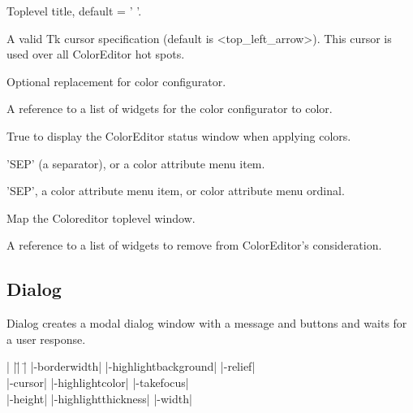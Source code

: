 \vskip5pt

\begin{enum}{1cm}

Toplevel title, default = ' '.

A valid Tk cursor specification (default is <top\_left\_arrow>).  This cursor is used over all ColorEditor
hot spots.

Optional replacement for  color configurator.

A reference to a list of widgets for the color configurator to color.

True to display the ColorEditor status window when applying colors.

'SEP' (a separator), or a color attribute menu item.

'SEP', a color attribute menu item, or color attribute menu ordinal.

\end{enum}

\vskip5pt

\begin{enum}{1cm}

Map the Coloreditor toplevel window.

A reference to a list of widgets to remove from ColorEditor's consideration.

\end{enum}

\subsection*{Dialog}
Dialog creates a modal dialog window with a message and buttons and waits
for a user response.
\vskip5pt
\vspace{-4pt}

\begin{tabbing}
|                   |\=|                     |\= \kill
|-borderwidth| \> |-highlightbackground|     \> |-relief| \\   
|-cursor|      \> |-highlightcolor|          \> |-takefocus| \\
|-height|      \> |-highlightthickness|      \> |-width| \\
\end{tabbing}

